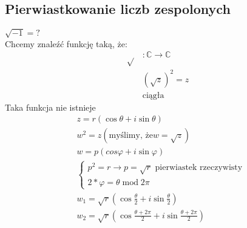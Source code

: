 \subsection{Pierwiastkowanie liczb zespolonych}
$\sqrt{-1} = ?$ \\ 
Chcemy znaleźć funkcję taką, że: 
\begin{align*}
    \sqrt{} &: \mathbb{C} \to \mathbb{C}  \\ 
        &(\sqrt{z})^2 = z  \\ 
        & \text{ciągła} 
\end{align*}
Taka funkcja nie istnieje 
\begin{align*}
    &z = r(\cos\theta + i\sin\theta) \\
    &w^2 = z (\text{myślimy, że} w = \sqrt{z}) \\
    &w = p(cos\varphi + i\sin\varphi) \\
  &\begin{cases} 
        p^2 = r \to p = \sqrt{r} \text{ pierwiastek rzeczywisty} \\
        2*\varphi = \theta \operatorname{mod} 2\pi
    \end{cases}  \\
    &w_1 = \sqrt{r} (\cos\frac{\theta}{2} + i\sin\frac{\theta}{2}) \\ 
    &w_2= \sqrt{r}(\cos\frac{\theta + 2\pi}{2} + i\sin\frac{\theta+2\pi}{2}) \end{align*}
